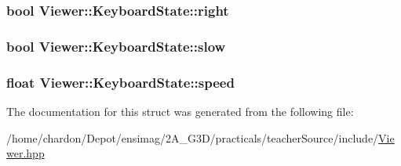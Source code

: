 \hypertarget{structViewer_1_1KeyboardState_ab99ed857a88dfc02666c1f46c54a399b}{
\subsubsection[{right}]{\setlength{\rightskip}{0pt plus 5cm}bool Viewer\+::\+Keyboard\+State\+::right}}\label{structViewer_1_1KeyboardState_ab99ed857a88dfc02666c1f46c54a399b}
\hypertarget{structViewer_1_1KeyboardState_a27fd5febb1ceab3d525a1a59cedc3160}{
\subsubsection[{slow}]{\setlength{\rightskip}{0pt plus 5cm}bool Viewer\+::\+Keyboard\+State\+::slow}}\label{structViewer_1_1KeyboardState_a27fd5febb1ceab3d525a1a59cedc3160}
\hypertarget{structViewer_1_1KeyboardState_a8e513c17dc12608e1a15eceb2697ed16}{
\subsubsection[{speed}]{\setlength{\rightskip}{0pt plus 5cm}float Viewer\+::\+Keyboard\+State\+::speed}}\label{structViewer_1_1KeyboardState_a8e513c17dc12608e1a15eceb2697ed16}


The documentation for this struct was generated from the following file\+:\begin{DoxyCompactItemize}
\item 
/home/chardon/\+Depot/ensimag/2\+A\+\_\+\+G3\+D/practicals/teacher\+Source/include/\hyperlink{Viewer_8hpp}{Viewer.\+hpp}\end{DoxyCompactItemize}
